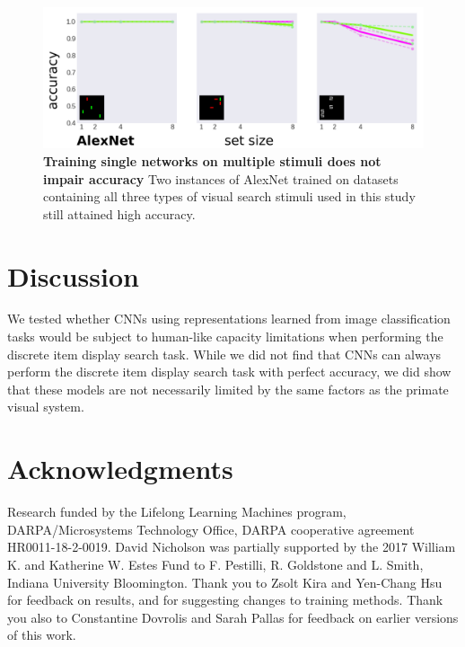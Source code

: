 \documentclass[10pt,letterpaper]{article}
\begin{document}
\begin{figure}[!ht]
\begin{center}
\includegraphics[width=\columnwidth]{fig4/fig4.png}
\end{center}
\caption{
\textbf{Training single networks on multiple stimuli does not impair accuracy}
Two instances of AlexNet trained on datasets containing all three types of visual search 
stimuli used in this study still attained high accuracy.
} 
\label{fig4}
\end{figure}

\section{Discussion}
We tested whether CNNs using representations learned from image classification tasks would be subject 
to human-like capacity limitations when performing the discrete item display search task. While we 
did not find that CNNs can always perform the discrete item display search task with perfect accuracy, 
we did show that these models are not necessarily limited by the same factors as the primate visual system.

\section{Acknowledgments}
Research funded by the Lifelong Learning Machines program, 
DARPA/Microsystems Technology Office, DARPA cooperative agreement HR0011-18-2-0019.
David Nicholson was partially supported by the 2017 William K. and Katherine W. Estes Fund
to F. Pestilli, R. Goldstone and L. Smith, Indiana University Bloomington.
Thank you to Zsolt Kira and Yen-Chang Hsu for feedback on results,
and for suggesting changes to training methods.
Thank you also to Constantine Dovrolis and Sarah Pallas for feedback on earlier versions 
of this work.



\setlength{\bibleftmargin}{.125in}
\setlength{\bibindent}{-\bibleftmargin}


\end{document}
